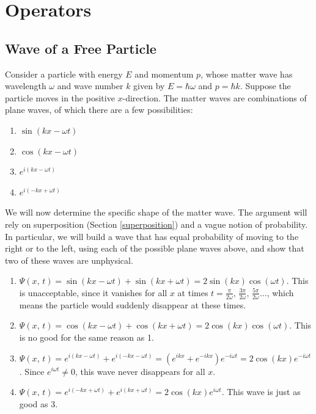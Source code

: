 \section{Operators}
\label{operators}
\subsection{Wave of a Free Particle}
\label{free_particle}

Consider a particle with energy $E$ and momentum $p$, whose matter wave has wavelength $\omega$ and wave number $k$ given by $E=\hbar\omega$ and $p=\hbar k$. Suppose the particle moves in the positive $x$-direction. The matter waves are combinations of plane waves, of which there are a few possibilities:

\begin{enumerate}
    \item $\sin(kx-\omega t)$
    \item $\cos(kx-\omega t)$
    \item $e^{i(kx-\omega t)}$
    \item $e^{i(-kx+\omega t)}$
\end{enumerate}

We will now determine the specific shape of the matter wave. The argument will rely on superposition (Section \ref{superposition}) and a vague notion of probability. In particular, we will build a wave that has equal probability of moving to the right or to the left, using each of the possible plane waves above, and show that two of these waves are unphysical.

\begin{enumerate}
    \item $\Psi(x,\,t)=\sin(kx-\omega t)+\sin(kx+\omega t)=2\sin(kx)\cos(\omega t)$. This is unacceptable, since it vanishes for all $x$ at times $t=\frac{\pi}{2\omega},\,\frac{3\pi}{2\omega},\,\frac{5\pi}{2\omega}\ldots$, which means the particle would suddenly disappear at these times.
    \item $\Psi(x,\,t)=\cos(kx-\omega t)+\cos(kx+\omega t)=2\cos(kx)\cos(\omega t)$. This is no good for the same reason as 1.
    \item $\Psi(x,\,t)=e^{i(kx-\omega t)}+e^{i(-kx-\omega t)}=(e^{ikx}+e^{-ikx})e^{-i\omega t}=2\cos(kx)e^{-i\omega t}$. Since $e^{i\omega t}\neq 0$, this wave never disappears for all $x$.  
    \item $\Psi(x,\,t)=e^{i(-kx+\omega t)}+e^{i(kx+\omega t)}=2\cos(kx)e^{i\omega t}$. This wave is just as good as 3.
\end{enumerate}

